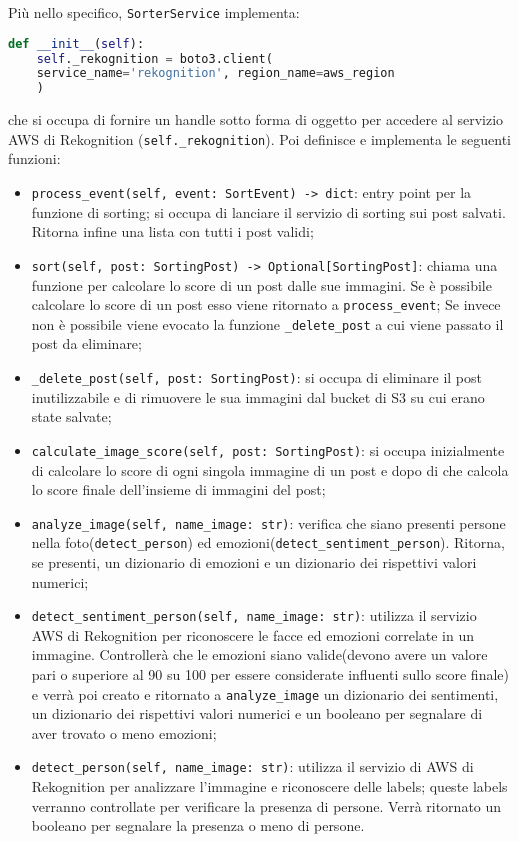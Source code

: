 Più nello specifico, \verb+SorterService+ implementa:
\begin{lstlisting}[language=Python]
    def __init__(self):
    self._rekognition = boto3.client(
    service_name='rekognition', region_name=aws_region
    )
\end{lstlisting} 
che si occupa di fornire un handle sotto forma di oggetto per accedere al servizio AWS di Rekognition
(\verb+self._rekognition+). 
Poi definisce e implementa le seguenti funzioni:
\begin{itemize}
	\item \verb+process_event(self, event: SortEvent) -> dict+: entry point per la funzione di sorting; si occupa di lanciare il servizio di sorting sui post salvati. Ritorna infine una lista con tutti i post validi;
	\item \verb+sort(self, post: SortingPost) -> Optional[SortingPost]+: chiama una funzione per calcolare lo score di un post dalle sue immagini. Se è possibile calcolare lo score di un post esso viene ritornato a \verb+process_event+; Se invece non è possibile viene evocato la funzione \verb+_delete_post+ a cui viene passato il post da eliminare;
	\item \verb+_delete_post(self, post: SortingPost)+: si occupa di eliminare il post inutilizzabile e di rimuovere le sua immagini dal bucket di S3 su cui erano state salvate;
	\item \verb+calculate_image_score(self, post: SortingPost)+: si occupa inizialmente di calcolare lo score di ogni singola immagine di un post e dopo di che calcola lo score finale dell'insieme di immagini del post;
	\item \verb+analyze_image(self, name_image: str)+: verifica che siano presenti persone nella foto(\verb+detect_person+) ed emozioni(\verb+detect_sentiment_person+). Ritorna, se presenti, un dizionario di emozioni e un dizionario dei rispettivi valori numerici;
	\item \verb+detect_sentiment_person(self, name_image: str)+: utilizza il servizio AWS di Rekognition per riconoscere le facce ed emozioni correlate in un immagine. Controllerà che le emozioni siano valide(devono avere un valore pari o superiore al 90 su 100 per essere considerate influenti sullo score finale) e verrà poi creato e ritornato a \verb+analyze_image+ un dizionario dei sentimenti, un dizionario dei rispettivi valori numerici e un booleano per segnalare di aver trovato o meno emozioni;
	\item \verb+detect_person(self, name_image: str)+: utilizza il servizio di AWS di Rekognition per analizzare l'immagine e riconoscere delle labels; queste labels verranno controllate per verificare la presenza di persone. Verrà ritornato un booleano per segnalare la presenza o meno di persone.
\end{itemize}
